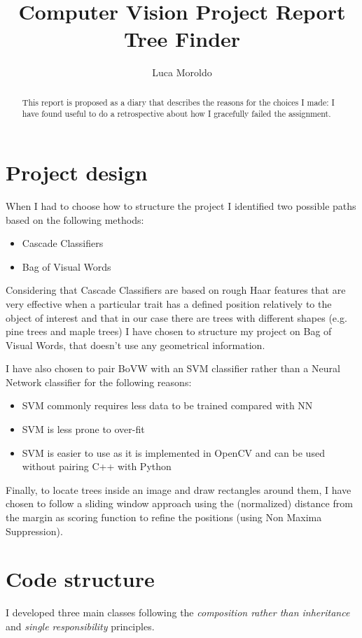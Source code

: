 \documentclass[]{report}
\title{Computer Vision Project Report \\ Tree Finder}
\author{Luca Moroldo}
\begin{document}
\maketitle

\begin{abstract}
	This report is proposed as a diary that describes the reasons for the choices I made: I have found useful to do a retrospective about how I gracefully failed the assignment.
\end{abstract}

\section{Project design}
When I had to choose how to structure the project I identified two possible paths based on the following methods:

\begin{itemize}
	\item Cascade Classifiers
	\item Bag of Visual Words
\end{itemize}

Considering that Cascade Classifiers are based on rough Haar features that are very effective when a particular trait has a defined position relatively to the object of interest and that in our case there are trees with different shapes (e.g. pine trees and maple trees) I have chosen to structure my project on Bag of Visual Words, that doesn't use any geometrical information.

I have also chosen to pair BoVW with an SVM classifier rather than a Neural Network classifier for the following reasons:

\begin{itemize}
	\item SVM commonly requires less data to be trained compared with NN
	\item SVM is less prone to over-fit
	\item SVM is easier to use as it is implemented in OpenCV and can be used without pairing C++ with Python
\end{itemize}

Finally, to locate trees inside an image and draw rectangles around them, I have chosen to follow a sliding window approach using the (normalized) distance from the margin as scoring function to refine the positions (using Non Maxima Suppression).


\section{Code structure}
I developed three main classes following the \textit{composition rather than inheritance} and \textit{single responsibility} principles.
\end{document}
